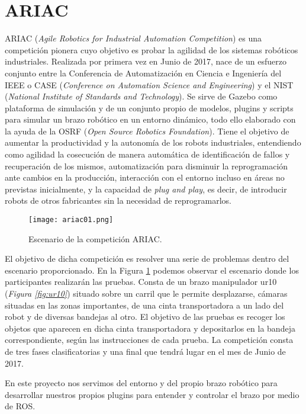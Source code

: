 \section{ARIAC}
\label{sec:plat_ariac}

ARIAC\cite{ariac} (\textit{Agile Robotics for Industrial Automation Competition}) es una competición pionera cuyo objetivo es probar la agilidad de los sistemas robóticos industriales. Realizada por primera vez en Junio de 2017, nace de un esfuerzo conjunto entre la Conferencia de Automatización en Ciencia e Ingeniería del IEEE o CASE (\textit{Conference on Automation Science and Engineering}) y el NIST (\textit{National Institute of Standards and Technology}). Se sirve de Gazebo como plataforma de simulación y de un conjunto propio de modelos, plugins y scripts para simular un brazo robótico en un entorno dinámico, todo ello elaborado con la ayuda de la OSRF (\textit{Open Source Robotics Foundation}). Tiene el objetivo de aumentar la productividad y la autonomía de los robots industriales, entendiendo como agilidad la cosecución de manera automática de identificación de fallos y recuperación de los mismos, automatización para disminuir la reprogramación ante cambios en la producción, interacción con el entorno incluso en áreas no previstas inicialmente, y la capacidad de \textit{plug and play}, es decir, de introducir robots de otros fabricantes sin la necesidad de reprogramarlos.

\begin{figure}[h]
	\centering\texttt{[image: ariac01.png]}
	\caption{Escenario de la competición ARIAC.}
	\label{fig:ariac01}
\end{figure}

El objetivo de dicha competición es resolver una serie de problemas dentro del escenario proporcionado. En la Figura \ref{fig:ariac01} podemos observar el escenario donde los participantes realizarán las pruebas. Consta de un brazo manipulador ur10 (\textit{Figura \ref{fig:ur10}}) situado sobre un carril que le permite desplazarse, cámaras situadas en las zonas importantes, de una cinta transportadora a un lado del robot y de diversas bandejas al otro. El objetivo de las pruebas es recoger los objetos que aparecen en dicha cinta transportadora y depositarlos en la bandeja correspondiente, según las instrucciones de cada prueba. La competición consta de tres fases clasificatorias y una final que tendrá lugar en el mes de Junio de 2017.

En este proyecto nos servimos del entorno y del propio brazo robótico para desarrollar nuestros propios plugins para entender y controlar el brazo por medio de ROS.


